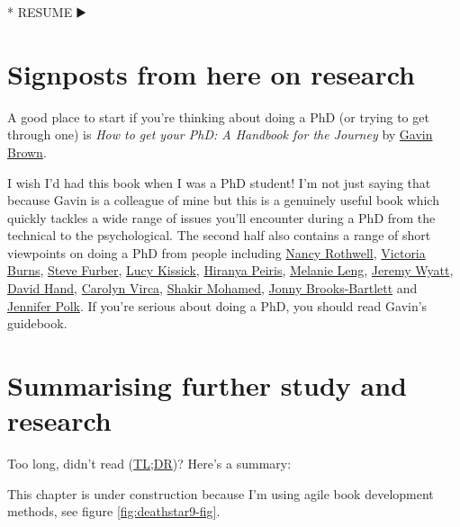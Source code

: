 \documentclass[
]{book}
\newenvironment{Shaded}{\begin{snugshade}}{\end{snugshade}}
\newcommand{\NormalTok}[1]{#1}
\newcommand{\SpecialStringTok}[1]{\textcolor[rgb]{0.31,0.60,0.02}{#1}}
\begin{document}
\begin{Shaded}
\begin{Highlighting}[]
\SpecialStringTok{* }\NormalTok{RESUME ▶️}
\end{Highlighting}
\end{Shaded}

\hypertarget{rsignposts}{%
\section{Signposts from here on research}\label{rsignposts}}

A good place to start if you're thinking about doing a PhD (or trying to get through one) is \emph{How to get your PhD: A Handbook for the Journey} by \href{https://twitter.com/profgavinbrown}{Gavin Brown}. \citep{howtogetyourphd}

I wish I'd had this book when I was a PhD student! I'm not just saying that because Gavin is a colleague of mine but this is a genuinely useful book which quickly tackles a wide range of issues you'll encounter during a PhD from the technical to the psychological. The second half also contains a range of short viewpoints on doing a PhD from people including \href{https://en.wikipedia.org/wiki/Nancy_Rothwell}{Nancy Rothwell}, \href{https://twitter.com/drvikkiburns}{Victoria Burns}, \href{https://en.wikipedia.org/wiki/Steve_Furber}{Steve Furber}, \href{https://www.lucykissick.co.uk/}{Lucy Kissick}, \href{https://en.wikipedia.org/wiki/Hiranya_Peiris}{Hiranya Peiris}, \href{https://en.wikipedia.org/wiki/Melanie_Leng}{Melanie Leng}, \href{https://www.cs.bham.ac.uk/~jlw/}{Jeremy Wyatt}, \href{https://en.wikipedia.org/wiki/David_Hand_(statistician)}{David Hand}, \href{https://www.linkedin.com/in/carolyn-virca-3446b558/}{Carolyn Virca}, \href{https://shakirm.com/}{Shakir Mohamed}, \href{https://medium.com/@jonnybrooks04}{Jonny Brooks-Bartlett} and \href{https://fromphdtolife.com/}{Jennifer Polk}. If you're serious about doing a PhD, you should read Gavin's guidebook.

\hypertarget{tldr12}{%
\section{Summarising further study and research}\label{tldr12}}

Too long, didn't read (\href{https://en.wiktionary.org/wiki/too_long;_didn\%27t_read}{TL;DR})? Here's a summary:

This chapter is under construction because I'm using agile book development methods, see figure \ref{fig:deathstar9-fig}.
\end{document}

